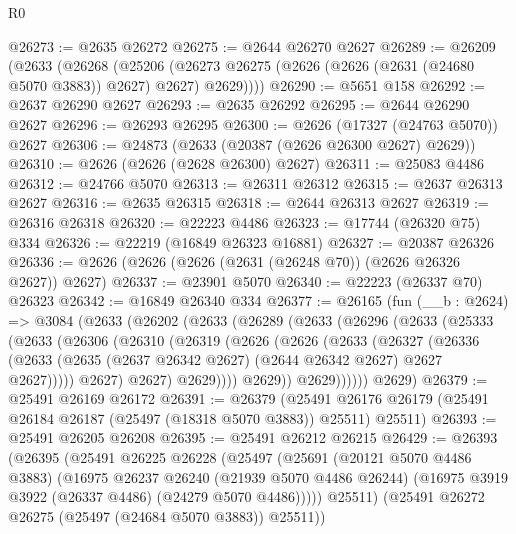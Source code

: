 \begin{lexlean}{R0}
\begin{coremodule}
@26273 := @2635 @26272
@26275 := @2644 @26270 @2627
@26289 := @26209
    (@2633
      (@26268
        (@25206 (@26273 @26275 (@2626 (@2626 (@2631 (@24680 @5070 @3883)) @2627) @2627) @2629))))
@26290 := @5651 @158
@26292 := @2637 @26290 @2627
@26293 := @2635 @26292
@26295 := @2644 @26290 @2627
@26296 := @26293 @26295
@26300 := @2626 (@17327 (@24763 @5070)) @2627
@26306 := @24873 (@2633 (@20387 (@2626 @26300 @2627) @2629))
@26310 := @2626 (@2626 (@2628 @26300) @2627)
@26311 := @25083 @4486
@26312 := @24766 @5070
@26313 := @26311 @26312
@26315 := @2637 @26313 @2627
@26316 := @2635 @26315
@26318 := @2644 @26313 @2627
@26319 := @26316 @26318
@26320 := @22223 @4486
@26323 := @17744 (@26320 @75) @334
@26326 := @22219 (@16849 @26323 @16881)
@26327 := @20387 @26326
@26336 := @2626 (@2626 (@2626 (@2631 (@26248 @70)) (@2626 @26326 @2627)) @2627)
@26337 := @23901 @5070
@26340 := @22223 (@26337 @70) @26323
@26342 := @16849 @26340 @334
@26377 := @26165
    (fun (__b : @2624) =>
    @3084
      (@2633
        (@26202
          (@2633
            (@26289
              (@2633
                (@26296
                  (@2633
                    (@25333
                      (@2633
                        (@26306
                          (@26310
                            (@26319
                              (@2626
                                (@2626
                                  (@2633
                                    (@26327
                                      (@26336
                                        (@2633
                                          (@2635
                                            (@2637 @26342 @2627)
                                            (@2644 @26342 @2627)
                                            @2627
                                            @2627)))))
                                  @2627)
                                @2627)
                              @2629))))
                      @2629))
                  @2629))))))
      @2629)
@26379 := @25491 @26169 @26172
@26391 := @26379
    (@25491 @26176 @26179 (@25491 @26184 @26187 (@25497 (@18318 @5070 @3883)) @25511) @25511)
@26393 := @25491 @26205 @26208
@26395 := @25491 @26212 @26215
@26429 := @26393
    (@26395
      (@25491
        @26225
        @26228
        (@25497
          (@25691
            (@20121 @5070 @4486 @3883)
            (@16975
              @26237
              @26240
              (@21939 @5070 @4486 @26244)
              (@16975 @3919 @3922 (@26337 @4486) (@24279 @5070 @4486)))))
        @25511)
      (@25491 @26272 @26275 (@25497 (@24684 @5070 @3883)) @25511))

\end{coremodule}
\end{lexlean}
